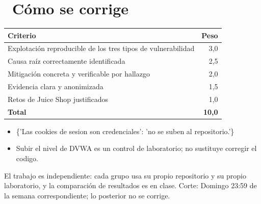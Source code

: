 \documentclass[11pt,a4paper]{article}
\newcommand{\iconotexto}[2]{\textcolor{cyanNeon}{\faIcon{#1}}~#2}
\begin{document}
\section{\iconotexto{ruler-combined}{Cómo se corrige}}

\begin{tabularx}{\linewidth}{@{}X r@{}}
\toprule
Criterio & Peso\\
\midrule
Explotación reproducible de los tres tipos de vulnerabilidad & 3,0 \\
Causa raíz correctamente identificada & 2,5 \\
Mitigación concreta y verificable por hallazgo & 2,0 \\
Evidencia clara y anonimizada & 1,5 \\
Retos de Juice Shop justificados & 1,0 \\
\midrule
\textbf{Total} & \textbf{10,0}\\
\bottomrule
\end{tabularx}

\begin{itemize}[leftmargin=1.4em,itemsep=2pt,topsep=3pt]
  \item \{'Las cookies de sesion son credenciales': 'no se suben al repositorio.'\}
  \item Subir el nivel de DVWA es un control de laboratorio; no sustituye corregir el codigo.
\end{itemize}

\begin{cajaRecuerda}El trabajo es independiente: cada grupo usa su propio repositorio y su propio laboratorio, y la comparación de resultados es en clase. Corte: Domingo 23:59 de la semana correspondiente; lo posterior no se corrige.
\end{cajaRecuerda}
\end{document}
